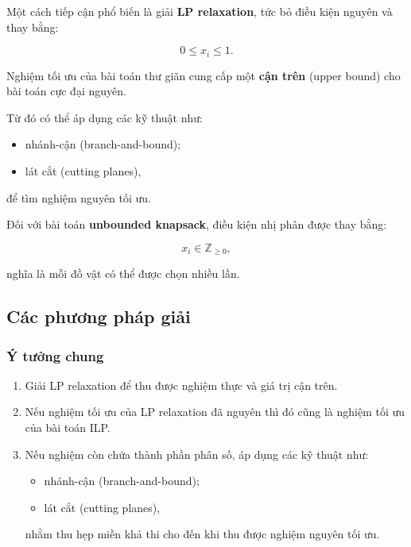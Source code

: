 \documentclass[fontsize=13pt,a4paper]{report}
\begin{document}
Một cách tiếp cận phổ biến là giải \textbf{LP relaxation}, tức bỏ điều kiện nguyên và thay bằng:

\[
0\le x_i\le1.
\]

Nghiệm tối ưu của bài toán thư giãn cung cấp một \textbf{cận trên} (upper bound) cho bài toán cực đại nguyên.

Từ đó có thể áp dụng các kỹ thuật như:

\begin{itemize}
    \item nhánh-cận (branch-and-bound);
    \item lát cắt (cutting planes),
\end{itemize}

để tìm nghiệm nguyên tối ưu.

Đối với bài toán \textbf{unbounded knapsack}, điều kiện nhị phân được thay bằng:

\[
x_i\in\mathbb{Z}_{\ge0},
\]

nghĩa là mỗi đồ vật có thể được chọn nhiều lần.

\subsection{Các phương pháp giải}

\subsubsection{Ý tưởng chung}

\begin{enumerate}

  \item Giải LP relaxation để thu được nghiệm thực và giá trị cận trên.

  \item Nếu nghiệm tối ưu của LP relaxation đã nguyên thì đó cũng là nghiệm tối ưu của bài toán ILP.

  \item Nếu nghiệm còn chứa thành phần phân số, áp dụng các kỹ thuật như:

  \begin{itemize}
      \item nhánh-cận (branch-and-bound);
      \item lát cắt (cutting planes),
  \end{itemize}

  nhằm thu hẹp miền khả thi cho đến khi thu được nghiệm nguyên tối ưu.

\end{enumerate}
\end{document}
